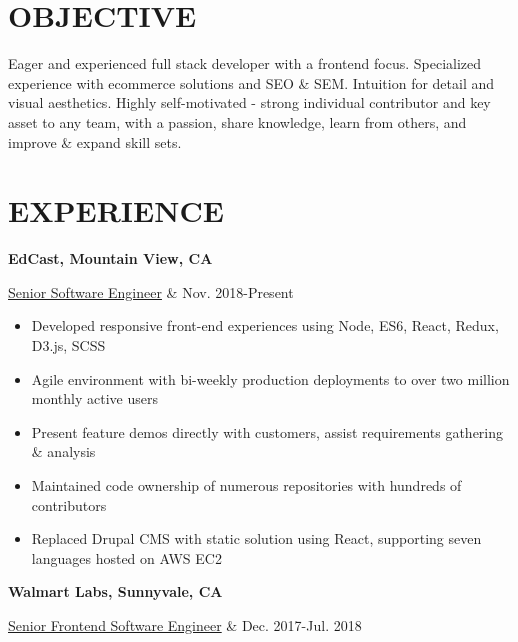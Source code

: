\documentclass[margin,10pt]{res} %
\begin{document}

\address{515 Central Avenue \#T \\ Mountain View, CA 94043\\ (415) 766-1867}
\address{jacob@swartz.id \\ www.linkedin.com/in/jacobswartz \\
	www.github.com/jjaaccoobb }

\begin{resume}

	\section{OBJECTIVE}
	Eager and experienced full stack developer with a frontend focus. Specialized experience with ecommerce solutions and SEO \& SEM. Intuition for detail and visual aesthetics. Highly self-motivated - strong individual contributor and key asset to any team, with a passion, share knowledge, learn from others, and improve \& expand skill sets.

	\section{EXPERIENCE}
	 {\bf EdCast, Mountain View, CA} \\
	\begin{ncolumn}{2} %
		\underline{Senior Software Engineer}     &      Nov. 2018-Present
	\end{ncolumn}

	\begin{itemize}
		\item Developed responsive front-end experiences using Node, ES6, React, Redux, D3.js, SCSS
		\item Agile environment with bi-weekly production deployments to over two million monthly active users
		\item Present feature demos directly with customers, assist requirements gathering \& analysis
		\item Maintained code ownership of numerous repositories with hundreds of contributors
		\item Replaced Drupal CMS with static solution using React, supporting seven languages hosted on AWS EC2

	\end{itemize}
	{\bf Walmart Labs, Sunnyvale, CA} \\
	\begin{ncolumn}{2} %
		\underline{Senior Frontend Software Engineer}     &      Dec. 2017-Jul. 2018
	\end{ncolumn}


\end{resume}
\end{document}
